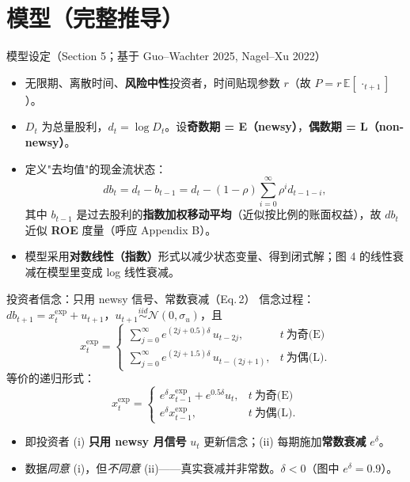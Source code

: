 \documentclass[aspectratio=169,10pt]{beamer}
\newcommand{\xexp}{x^{\mathrm{exp}}}
\begin{document}
\section{模型（完整推导）}

\begin{frame}{模型设定（Section 5；基于 Guo--Wachter 2025, Nagel--Xu 2022）}
	\begin{itemize}
		\item 无限期、离散时间、\textbf{风险中性}投资者，时间贴现参数 $r$（故 $P=r\,\mathbb{E}[\,\cdot_{t+1}]$）。
		\item $D_t$ 为总量股利，$d_t=\log D_t$。设\textbf{奇数期 = E（newsy）}，\textbf{偶数期 = L（non-newsy）}。
		\item 定义"去均值"的现金流状态：
		\[
		db_t = d_t - b_{t-1} = d_t-(1-\rho)\sum_{i=0}^{\infty}\rho^{i}d_{t-1-i},
		\]
		其中 $b_{t-1}$ 是过去股利的\textbf{指数加权移动平均}（近似按比例的账面权益），故 $db_t$ 近似 \textbf{ROE} 度量（呼应 Appendix B）。
		\item 模型采用\textbf{对数线性（指数）}形式以减少状态变量、得到闭式解；图 4 的线性衰减在模型里变成 log 线性衰减。
	\end{itemize}
\end{frame}

\begin{frame}{投资者信念：只用 newsy 信号、常数衰减（Eq.\,2）}
	信念过程：$db_{t+1}=\xexp_t+u_{t+1}$，$u_{t+1}\overset{iid}{\sim}\mathcal{N}(0,\sigma_u)$，且
	\[
	\xexp_t=
	\begin{cases}
		\displaystyle\sum_{j=0}^{\infty}e^{(2j+0.5)\delta}\,u_{t-2j}, & t\ \text{为奇(E)}\\[2.0ex]
		\displaystyle\sum_{j=0}^{\infty}e^{(2j+1.5)\delta}\,u_{t-(2j+1)}, & t\ \text{为偶(L)}.
	\end{cases}
	\]
	等价的递归形式：
	\[
	\xexp_t=
	\begin{cases}
		e^{\delta}\xexp_{t-1}+e^{0.5\delta}u_t, & t\ \text{为奇(E)}\\[0.6ex]
		e^{\delta}\xexp_{t-1}, & t\ \text{为偶(L)}.
	\end{cases}
	\]
	\begin{itemize}
		\item 即投资者 (i) \textbf{只用 newsy 月信号} $u_t$ 更新信念；(ii) 每期施加\textbf{常数衰减} $e^{\delta}$。
		\item 数据\emph{同意} (i)，但\emph{不同意} (ii)——真实衰减并非常数。$\delta<0$（图中 $e^{\delta}=0.9$）。
	\end{itemize}
\end{frame}
\end{document}
